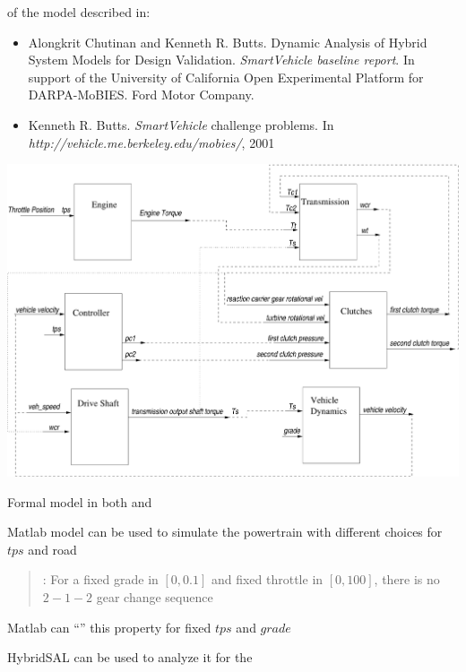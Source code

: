 \documentclass{seminar}
\begin{document}
\begin{slide}

{} of the model described in:

\begin{itemize}
\item
 Alongkrit Chutinan and Kenneth R. Butts.
 Dynamic Analysis of Hybrid System Models for Design Validation.
 {\em{SmartVehicle baseline report}}.
 In support of the University of California 
 Open Experimental Platform for DARPA-MoBIES.
 Ford Motor Company.

\item
  Kenneth R. Butts.
  {\em{SmartVehicle}} challenge problems.
  In {\em{http://vehicle.me.berkeley.edu/mobies/}}, 2001
\end{itemize}

\end{slide}
\begin{slide}

\begin{center}
\includegraphics[angle=0,scale=0.35]{powertrain}
\end{center}

\end{slide}
\begin{slide}

Formal model in both {} and {}

Matlab model can be used to simulate the powertrain with
different choices for {} $tps$
and road {}

\medskip
\begin{quote}
{}: 
For a fixed grade in $[0,0.1]$ and fixed throttle in $[0,100]$,
there is no $2-1-2$ gear change sequence
\end{quote}

\medskip
Matlab can ``{}'' this property for fixed $tps$ and $grade$

\bigskip
HybridSAL can be used to analyze it for the {}
\end{slide}
\end{document}

